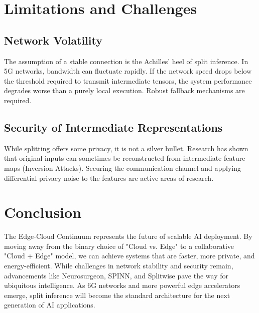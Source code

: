 \documentclass[runningheads]{llncs}
\begin{document}
\section{Limitations and Challenges}

\subsection{Network Volatility}
The assumption of a stable connection is the Achilles' heel of split inference. In 5G networks, bandwidth can fluctuate rapidly. If the network speed drops below the threshold required to transmit intermediate tensors, the system performance degrades worse than a purely local execution. Robust fallback mechanisms are required.

\subsection{Security of Intermediate Representations}
While splitting offers some privacy, it is not a silver bullet. Research has shown that original inputs can sometimes be reconstructed from intermediate feature maps (Inversion Attacks). Securing the communication channel and applying differential privacy noise to the features are active areas of research.

\section{Conclusion}
The Edge-Cloud Continuum represents the future of scalable AI deployment. By moving away from the binary choice of "Cloud vs. Edge" to a collaborative "Cloud + Edge" model, we can achieve systems that are faster, more private, and energy-efficient. While challenges in network stability and security remain, advancements like Neurosurgeon, SPINN, and Splitwise pave the way for ubiquitous intelligence. As 6G networks and more powerful edge accelerators emerge, split inference will become the standard architecture for the next generation of AI applications.

%
%


%
\end{document}

